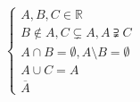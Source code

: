 
$$
\begin{cases}
    A,B,C\in \mathbb{R} \\
    B\not\in A, C\subsetneq A,A\supsetneqq C\\
    A\cap B = \emptyset, A\setminus B=\emptyset\\
    A\cup C = A\\
    \overline{A}
\end{cases}
$$

